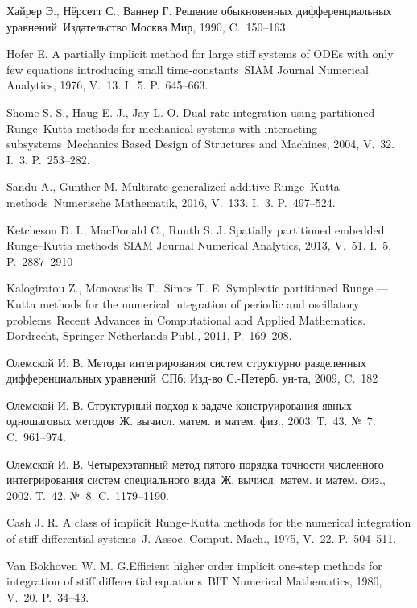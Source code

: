 \documentclass[a4paper,article,14pt]{extarticle}
\begin{document}
\begin{thebibliography}{1}
 Хайрер Э., Нёрсетт С., Ваннер Г. \flqq Решение обыкновенных дифференциальных уравнений\frqq~Издательство Москва Мир, 1990, C.~150--163.

 Hofer E. \flqq A partially implicit method for large stiff systems of ODEs with only few equations
introducing small time-constants\frqq~SIAM Journal Numerical Analytics, 1976, V.~13. I.~5. P.~645--663.

 Shome S. S., Haug E. J., Jay L. O. \flqq Dual-rate integration using partitioned Runge--Kutta methods for mechanical systems with interacting subsystems\frqq~Mechanics Based Design of Structures and Machines, 2004, V.~32. I.~3. P.~253--282.

 Sandu A., Gunther M. \flqq Multirate generalized additive Runge--Kutta methods\frqq~Numerische Mathematik, 2016, V.~133. I.~3. P.~497--524.

 Ketcheson D. I., MacDonald C., Ruuth S. J. \flqq Spatially partitioned embedded Runge--Kutta methods\frqq~SIAM Journal Numerical Analytics, 2013, V.~51. I.~5, P.~2887--2910

 Kalogiratou Z., Monovasilis T., Simos T. E. \flqq Symplectic partitioned Runge — Kutta methods for the numerical integration of periodic and oscillatory problems\frqq~Recent Advances in Computational and Applied Mathematics. Dordrecht, Springer Netherlands Publ., 2011, P.~169--208.

 Олемской И. В. \flqq Методы интегрирования систем структурно разделенных дифференциальных уравнений\frqq~СПб: Изд-во С.-Петерб. ун-та, 2009, C.~182

  Олемской И. В. \flqq Структурный подход к задаче конструирования явных одношаговых методов\frqq~Ж. вычисл. матем. и матем. физ., 2003. Т.~43. №~7. C.~961--974.

 Олемской И. В. \flqq Четырехэтапный метод пятого порядка точности численного интегрирования систем специального вида\frqq~Ж. вычисл. матем. и матем. физ., 2002. Т.~42. №~8. C.~1179--1190.

 Cash J. R. \flqq A class of implicit Runge-Kutta methods for the numerical integration of stiff differential systems\frqq~J. Assoc. Comput. Mach., 1975, V.~22. P.~504--511.

 Van Bokhoven W. M. G.\flqq Efficient higher order implicit one-step methods for integration of stiff differential equations\frqq~BIT Numerical Mathematics, 1980, V.~20. P.~34--43.


\end{thebibliography}
\end{document}
